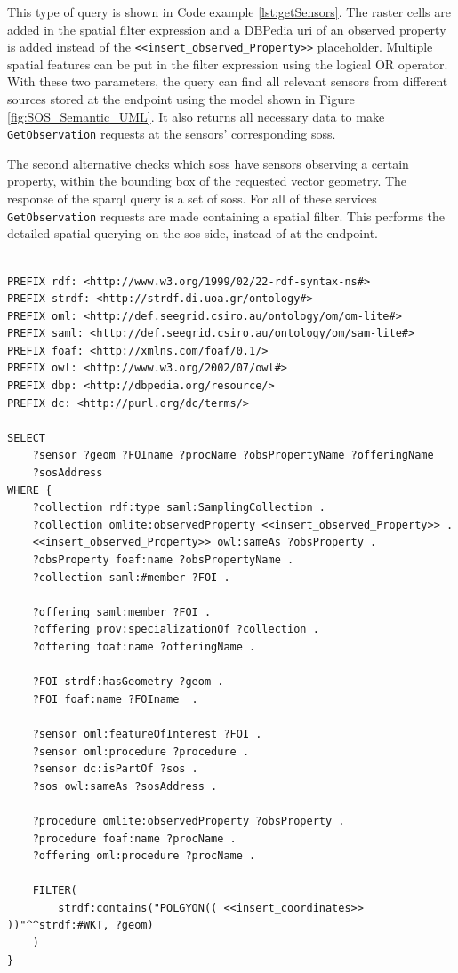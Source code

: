 This type of query is shown in Code example \ref{lst:getSensors}. The raster cells are added in the spatial filter expression and a DBPedia \ac{uri} of an observed property is added instead of the \texttt{<<insert\_observed\_Property>>} placeholder. Multiple spatial features can be put in the filter expression using the logical OR operator. With these two parameters, the query can find all relevant sensors from different sources stored at the endpoint using the model shown in Figure \ref{fig:SOS_Semantic_UML}. It also returns all necessary data to make \texttt{GetObservation} requests at the sensors' corresponding \aclp{sos}.

The second alternative checks which \aclp{sos} have sensors observing a certain property, within the bounding box of the requested vector geometry. The response of the \ac{sparql} query is a set of \aclp{sos}. For all of these services \texttt{GetObservation} requests are made containing a spatial filter. This performs the detailed spatial querying on the \ac{sos} side, instead of at the endpoint. 

\begin{lstlisting}[float,caption={A spatial SPARQL query for discovering sensors and their SOS related metadata}, label={lst:getSensors}]

PREFIX rdf: <http://www.w3.org/1999/02/22-rdf-syntax-ns#>
PREFIX strdf: <http://strdf.di.uoa.gr/ontology#>
PREFIX oml: <http://def.seegrid.csiro.au/ontology/om/om-lite#>
PREFIX saml: <http://def.seegrid.csiro.au/ontology/om/sam-lite#>
PREFIX foaf: <http://xmlns.com/foaf/0.1/>
PREFIX owl: <http://www.w3.org/2002/07/owl#>
PREFIX dbp: <http://dbpedia.org/resource/>
PREFIX dc: <http://purl.org/dc/terms/>

SELECT 
	?sensor ?geom ?FOIname ?procName ?obsPropertyName ?offeringName 
	?sosAddress
WHERE {
	?collection rdf:type saml:SamplingCollection .
	?collection omlite:observedProperty <<insert_observed_Property>> .
	<<insert_observed_Property>> owl:sameAs ?obsProperty .
	?obsProperty foaf:name ?obsPropertyName .
	?collection saml:#member ?FOI .
	
	?offering saml:member ?FOI . 
	?offering prov:specializationOf ?collection .
	?offering foaf:name ?offeringName .
	
	?FOI strdf:hasGeometry ?geom . 
	?FOI foaf:name ?FOIname  .
	
	?sensor oml:featureOfInterest ?FOI .
	?sensor oml:procedure ?procedure .
	?sensor dc:isPartOf ?sos .
	?sos owl:sameAs ?sosAddress .
	
	?procedure omlite:observedProperty ?obsProperty .
	?procedure foaf:name ?procName .
	?offering oml:procedure ?procName .
	
	FILTER(
		strdf:contains("POLGYON(( <<insert_coordinates>> ))"^^strdf:#WKT, ?geom)
	)		
}
\end{lstlisting}

